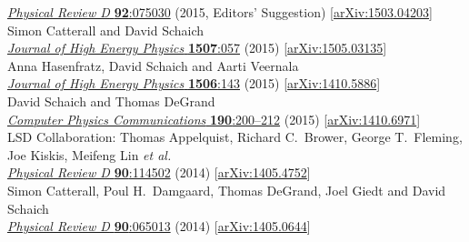 \begin{spacelist}
\begin{revnumerate}
      \href{http://dx.doi.org/10.1103/PhysRevD.92.075030}{\textit{Physical Review D} \textbf{92}:075030} (2015, Editors' Suggestion) [\href{http://arxiv.org/abs/1503.04203}{arXiv:1503.04203}]
    \pagebreakitem
       \\
      Simon Catterall and David Schaich \\
      \href{http://dx.doi.org/10.1007/JHEP07(2015)057}{\textit{Journal of High Energy Physics} \textbf{1507}:057} (2015) [\href{http://arxiv.org/abs/1505.03135}{arXiv:1505.03135}]
    \pagebreakitem
       \\
      Anna Hasenfratz, David Schaich and Aarti Veernala \\
      \href{http://dx.doi.org/10.1007/JHEP06(2015)143}{\textit{Journal of High Energy Physics} \textbf{1506}:143} (2015) [\href{http://arxiv.org/abs/1410.5886}{arXiv:1410.5886}]
    \pagebreakitem
       \\
      David Schaich and Thomas DeGrand \\
      \href{http://dx.doi.org/10.1016/j.cpc.2014.12.025}{\textit{Computer Physics Communications} \textbf{190}:200--212} (2015) [\href{http://arxiv.org/abs/1410.6971}{arXiv:1410.6971}]
    \pagebreakitem
       \\
      LSD Collaboration: Thomas Appelquist, Richard C.~Brower, George T.~Fleming, Joe Kiskis, Meifeng Lin \textit{et al.} \\ %
      \href{http://dx.doi.org/10.1103/PhysRevD.90.114502}{\textit{Physical Review D} \textbf{90}:114502} (2014) [\href{http://arxiv.org/abs/1405.4752}{arXiv:1405.4752}]
    \pagebreakitem
       \\
      Simon Catterall, Poul H.~Damgaard, Thomas DeGrand, Joel Giedt and David Schaich \\
      \href{http://dx.doi.org/10.1103/PhysRevD.90.065013}{\textit{Physical Review D} \textbf{90}:065013} (2014) [\href{http://arxiv.org/abs/1405.0644}{arXiv:1405.0644}]
    \pagebreakitem
       \\

\end{revnumerate}
\end{spacelist}
